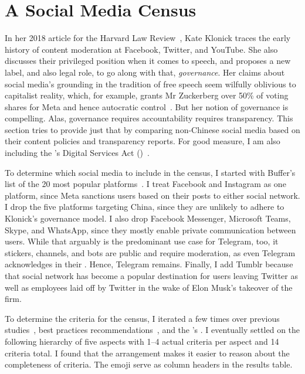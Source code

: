 \section{A Social Media Census}
\label{sec:census}

In her 2018 article for the Harvard Law Review~\cite{Klonick2018}, Kate Klonick
traces the early history of content moderation at Facebook, Twitter, and
YouTube. She also discusses their privileged position when it comes to speech,
and proposes a new label, and also legal role, to go along with that,
\emph{governance}. Her claims about social media's grounding in the tradition of
free speech seem wilfully oblivious to capitalist reality, which, for example,
grants Mr Zuckerberg over 50\% of voting shares for Meta and hence autocratic
control~\cite{LauricellaNorton2021}. But her notion of governance is compelling.
Alas, governance requires accountability requires transparency. This section
tries to provide just that by comparing non-Chinese social media based on their
content policies and transparency reports. For good measure, I am also including
the \EU's Digital Services Act (\DSA)~\cite{EuropeanParliamentAndCouncil2022}.

To determine which social media to include in the census, I started with
Buffer's list of the 20 most popular platforms~\cite{Lua2022}. I treat Facebook
and Instagram as one platform, since Meta sanctions users based on their posts
to either social network. I drop the five platforms targeting China, since they
are unlikely to adhere to Klonick's governance model. I also drop Facebook
Messenger, Microsoft Teams, Skype, and WhatsApp, since they mostly enable
private communication between users. While that arguably is the predominant use
case for Telegram, too, it stickers, channels, and bots are public and require
moderation, as even Telegram acknowledges in their \FAQ. Hence, Telegram
remains. Finally, I add Tumblr because that social network has become a popular
destination for users leaving Twitter as well as employees laid off by Twitter
in the wake of Elon Musk's takeover of the firm.

To determine the criteria for the census, I iterated a few times over previous
studies~\cite{BradfordGriselea2019,CrockerGebhartea2019}, best practices
recommendations~\cite{AccessNowACLUFoundationOfNorthernCaliforniaea2021}, and
the \EU's \DSA. I eventually settled on the following hierarchy of five aspects
with 1--4 actual criteria per aspect and 14 criteria total. I found that the
arrangement makes it easier to reason about the completeness of criteria. The
emoji serve as column headers in the results table.

